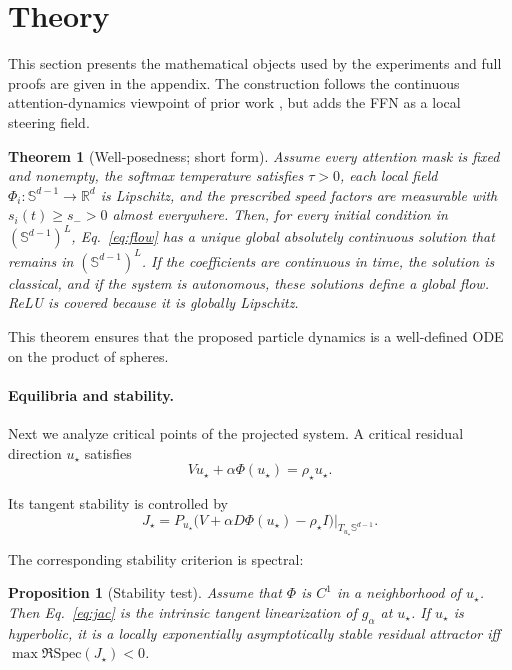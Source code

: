\documentclass[11pt]{article}
\newtheorem{theorem}{Theorem}
\newtheorem{proposition}{Proposition}
\newcommand{\R}{\mathbb{R}}
\newcommand{\Sph}{\mathbb{S}}
\newcommand{\Spec}{\mathrm{Spec}}
\begin{document}
\section{Theory}

This section presents the mathematical objects used by the experiments and full proofs are given in the appendix. The construction follows the continuous attention-dynamics viewpoint of prior work \citep{geshkovski2023mathematical,karagodin2024causal,karagodin2025normalization}, but adds the FFN as a local steering field.

\begin{theorem}[Well-posedness; short form]\label{thm:wp}
Assume every attention mask is fixed and nonempty, the softmax temperature satisfies
$\tau>0$, each local field $\Phi_i:\Sph^{d-1}\to\R^d$ is Lipschitz, and the
prescribed speed factors are measurable with $s_i(t)\ge s_->0$ almost everywhere.
Then, for every initial condition in $(\Sph^{d-1})^L$, Eq.~\eqref{eq:flow} has a
unique global absolutely continuous solution that remains in
$(\Sph^{d-1})^L$. If the coefficients are continuous in time, the solution is
classical, and if the system is autonomous, these solutions define a global flow.
ReLU is covered because it is globally Lipschitz.
\end{theorem}

This theorem ensures that the proposed particle dynamics is a well-defined ODE on the product of spheres. 

\paragraph{Equilibria and stability.}
Next we analyze critical points of the projected system. A critical residual direction $u_\star$ satisfies
\begin{equation}
Vu_\star+\alpha\Phi(u_\star)=\rho_\star u_\star.
\label{eq:eq}
\end{equation}

Its tangent stability is controlled by
\begin{equation}
J_\star=P_{u_\star}\big(V+\alpha D\Phi(u_\star)-\rho_\star I\big)|_{T_{u_\star}\Sph^{d-1}}.
\label{eq:jac}
\end{equation}

The corresponding stability criterion is spectral:
\begin{proposition}[Stability test]\label{prop:stab}
Assume that $\Phi$ is $C^1$ in a neighborhood of $u_\star$. Then
Eq.~\eqref{eq:jac} is the intrinsic tangent linearization of $g_\alpha$ at
$u_\star$. If $u_\star$ is hyperbolic, it is a locally exponentially
asymptotically stable residual attractor iff $\max\Re\Spec(J_\star)<0$.
\end{proposition}
\end{document}
